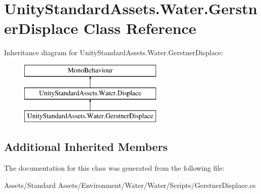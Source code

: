 \hypertarget{class_unity_standard_assets_1_1_water_1_1_gerstner_displace}{}\section{Unity\+Standard\+Assets.\+Water.\+Gerstner\+Displace Class Reference}
\label{class_unity_standard_assets_1_1_water_1_1_gerstner_displace}
Inheritance diagram for Unity\+Standard\+Assets.\+Water.\+Gerstner\+Displace\+:\begin{figure}[H]
\begin{center}
\leavevmode
\includegraphics[height=3.000000cm]{class_unity_standard_assets_1_1_water_1_1_gerstner_displace}
\end{center}
\end{figure}
\subsection*{Additional Inherited Members}


The documentation for this class was generated from the following file\+:\begin{DoxyCompactItemize}
\item 
Assets/\+Standard Assets/\+Environment/\+Water/\+Water/\+Scripts/Gerstner\+Displace.\+cs\end{DoxyCompactItemize}
